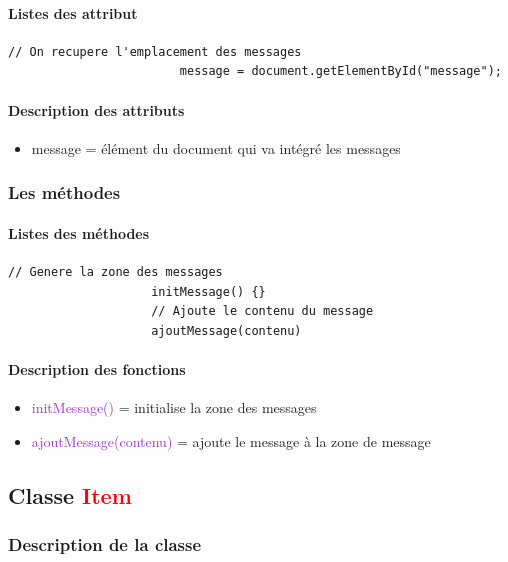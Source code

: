 \documentclass[12pt,a4paper]{report}
\begin{document}
					\paragraph{Listes des attribut}
					\begin{lstlisting}[caption={Attributs classe Message}]
						// On recupere l'emplacement des messages 
						message = document.getElementById("message");
					\end{lstlisting}
					\paragraph{Description des attributs}
					\begin{itemize}
						\item message = élément du document qui va intégré les messages
					\end{itemize}
   	 		\subsubsection{Les méthodes}
				\paragraph{Listes des méthodes}
				\begin{lstlisting}[caption={Méthodes classe Message}]
					// Genere la zone des messages
				    initMessage() {}
					// Ajoute le contenu du message
					ajoutMessage(contenu)
				\end{lstlisting}
				\paragraph{Description des fonctions}
				\begin{itemize}
					\item \textcolor{DarkOrchid}{initMessage()} = initialise la zone des messages
					\item \textcolor{DarkOrchid}{ajoutMessage(contenu)} = ajoute le message à la zone de message
				\end{itemize}
			\newpage
			
   	 	\subsection{Classe \textcolor{red}{Item}}
			\subsubsection{Description de la classe}
\end{document}
